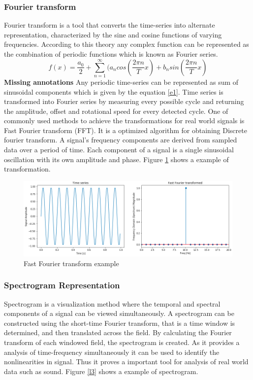     \subsubsection{Fourier transform}
    Fourier transform is a tool that converts the time-series  into alternate representation, characterized by the sine and cosine functions of varying frequencies. According to this theory any complex function can be represented as the combination of periodic functions which is known as Fourier series.
    \begin{equation}
    f(x) = \frac{a_0}{2}+\sum_{n=1}^{\infty}(a_ncos(\frac{2\pi n}{T}x)+b_nsin(\frac{2\pi n}{T}x)
    \label{e1}
    \end{equation}
    \textbf{Missing annotations}
    Any periodic time-series can be represented as sum of sinusoidal components which is given by the equation \ref{e1}. Time series is transformed into Fourier series by measuring every possible cycle and returning the amplitude, offset and rotational speed for every detected cycle. One of commonly used methods to achieve the transformations for real world signals is Fast Fourier transform (FFT). It is a optimized algorithm for obtaining Discrete fourier transform. A signal's frequency components are derived from sampled data over a period of time. Each component of a signal is a single sinusoidal oscillation with its own amplitude and phase.
    Figure \ref{l2} shows a example of transformation. 
    \begin{figure}[h]
        	\centering
        	\includegraphics[width=0.75\linewidth]{images/fft.png}
        	\caption{Fast Fourier transform example \cite{imgfft}}
        	\label{l2}
    \end{figure}

    \subsubsection{Spectrogram Representation}
    Spectrogram is a visualization method where the temporal and spectral components of a signal can be viewed simultaneously. A spectrogram can be constructed using the short-time Fourier transform, that is a time window is determined, and then translated across the field. By calculating the Fourier transform of each windowed field, the spectrogram is created. As it provides a analysis of time-frequency simultaneously it can be used to identify the nonlinearities in signal. Thus it proves a important tool for analysis of real world data such as sound.  Figure \ref{l3} shows a example of spectrogram.
    
